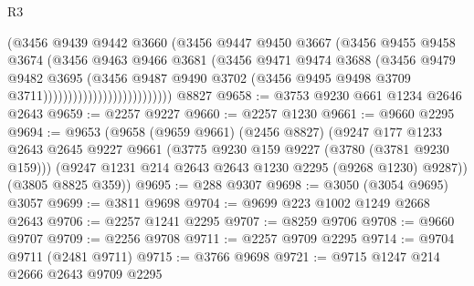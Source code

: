 \begin{lexlean}{R3}
\begin{coremodule}
                                        (@3456
                                          @9439
                                          @9442
                                          @3660
                                          (@3456
                                            @9447
                                            @9450
                                            @3667
                                            (@3456
                                              @9455
                                              @9458
                                              @3674
                                              (@3456
                                                @9463
                                                @9466
                                                @3681
                                                (@3456
                                                  @9471
                                                  @9474
                                                  @3688
                                                  (@3456
                                                    @9479
                                                    @9482
                                                    @3695
                                                    (@3456
                                                      @9487
                                                      @9490
                                                      @3702
                                                      (@3456
                                                        @9495
                                                        @9498
                                                        @3709
                                                        @3711))))))))))))))))))))))))))
    @8827
@9658 := @3753 @9230 @661 @1234 @2646 @2643
@9659 := @2257 @9227
@9660 := @2257 @1230
@9661 := @9660 @2295
@9694 := @9653
    (@9658
      (@9659 @9661)
      (@2456 @8827)
      (@9247
        @177
        @1233
        @2643
        @2645
        @9227
        @9661
        (@3775 @9230 @159 @9227 (@3780 (@3781 @9230 @159)))
        (@9247 @1231 @214 @2643 @2643 @1230 @2295 (@9268 @1230) @9287))
      (@3805 @8825 @359))
@9695 := @288 @9307
@9698 := @3050 (@3054 @9695) @3057
@9699 := @3811 @9698
@9704 := @9699 @223 @1002 @1249 @2668 @2643
@9706 := @2257 @1241 @2295
@9707 := @8259 @9706
@9708 := @9660 @9707
@9709 := @2256 @9708
@9711 := @2257 @9709 @2295
@9714 := @9704 @9711 (@2481 @9711)
@9715 := @3766 @9698
@9721 := @9715 @1247 @214 @2666 @2643 @9709 @2295

\end{coremodule}
\end{lexlean}
